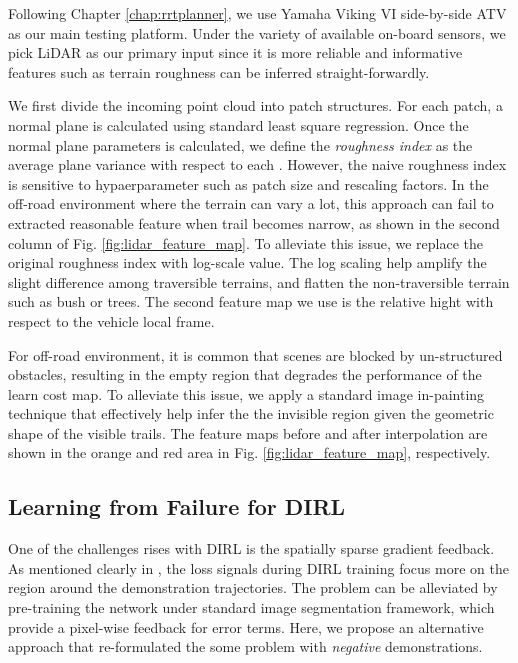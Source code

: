 \documentclass[../thesis.tex]{subfiles}
\begin{document}
Following Chapter \ref{chap:rrtplanner}, 
we use Yamaha Viking VI side-by-side ATV as our main testing platform.
Under the variety of available on-board sensors, we pick LiDAR as our primary input since it is more reliable and informative features such as terrain roughness can be inferred straight-forwardly.

We first divide the incoming point cloud into patch structures. For each patch, a normal plane is calculated using standard least square regression. Once the normal plane parameters is calculated, we define the \textit{roughness index} as the average plane variance with respect to each . 
However, the naive roughness index is sensitive to hypaerparameter such as patch size and rescaling factors. In the off-road environment where the terrain can vary a lot, this approach can fail to extracted reasonable feature when trail becomes narrow, as shown in the second column of Fig. \ref{fig:lidar_feature_map}. 
To alleviate this issue, we replace the original roughness index with log-scale value. The log scaling help amplify the slight difference among traversible terrains, and flatten the non-traversible terrain such as bush or trees. 
The second feature map we use is the relative hight with respect to the vehicle local frame. 

For off-road environment, it is common that scenes are blocked by un-structured obstacles, resulting in the empty region that degrades the performance of the learn cost map. 
To alleviate this issue, we apply a standard image in-painting technique \cite{telea2004image} 
that effectively help infer the the invisible region given the geometric shape of the visible trails. 
The feature maps before and after interpolation are shown in the orange and red area in Fig. \ref{fig:lidar_feature_map}, respectively.



\subsection{Learning from Failure for DIRL}


One of the challenges rises with DIRL is the spatially sparse gradient feedback. As mentioned clearly in \cite{wulfmeier2016incorporating}, the loss signals during DIRL training focus more on the region around the demonstration trajectories. 
The problem can be alleviated by pre-training the network under standard image segmentation framework, which provide a pixel-wise feedback for error terms. Here, we propose an alternative approach that re-formulated the some problem with \textit{negative} demonstrations.
\end{document}

